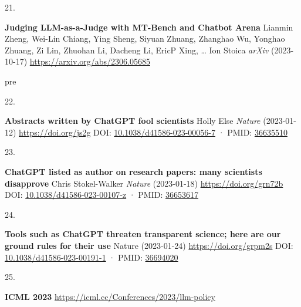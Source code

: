 \documentclass[
]{article}
\newlength{\cslhangindent}
\newlength{\csllabelwidth}
\newlength{\cslentryspacingunit} %
\newenvironment{CSLReferences}[2] %
 {%
  \setlength{\parindent}{0pt}
  \ifodd #1
  \let\oldpar\par
  \def\par{\hangindent=\cslhangindent\oldpar}
  \fi
  \setlength{\parskip}{#2\cslentryspacingunit}
 }%
 {}
\newcommand{\CSLBlock}[1]{#1\hfill\break}
\newcommand{\CSLLeftMargin}[1]{\parbox[t]{\csllabelwidth}{#1}}
\newcommand{\CSLRightInline}[1]{\parbox[t]{\linewidth - \csllabelwidth}{#1}\break}
\providecommand{\DIFaddtex}[1]{{\protect\color{blue}\uwave{#1}}} %
\providecommand{\DIFaddbegin}{} %
\providecommand{\DIFaddend}{} %
\providecommand{\DIFdelbegin}{} %
\providecommand{\DIFdelend}{} %
\providecommand{\DIFadd}[1]{\texorpdfstring{\DIFaddtex{#1}}{#1}} %
\newcommand{\DIFscaledelfig}{0.5}
\newlength{\DIFdelgraphicswidth} %
\newlength{\DIFdelgraphicsheight} %
\newcommand{\DIFaddincludegraphics}[2][]{{\color{blue}\fbox{\DIFOincludegraphics[#1]{#2}}}} %
\newcommand{\DIFdelincludegraphics}[2][]{%
\sbox{\DIFdelgraphicsbox}{\DIFOincludegraphics[#1]{#2}}%
\settoboxwidth{\DIFdelgraphicswidth}{\DIFdelgraphicsbox} %
\settoboxtotalheight{\DIFdelgraphicsheight}{\DIFdelgraphicsbox} %
\scalebox{\DIFscaledelfig}{%
\parbox[b]{\DIFdelgraphicswidth}{\usebox{\DIFdelgraphicsbox}\\[-\baselineskip] \rule{\DIFdelgraphicswidth}{0em}}\llap{\resizebox{\DIFdelgraphicswidth}{\DIFdelgraphicsheight}{%
\setlength{\unitlength}{\DIFdelgraphicswidth}%
\begin{picture}(1,1)%
\thicklines\linethickness{2pt} %
{\color[rgb]{1,0,0}\put(0,0){\framebox(1,1){}}}%
{\color[rgb]{1,0,0}\put(0,0){\line( 1,1){1}}}%
{\color[rgb]{1,0,0}\put(0,1){\line(1,-1){1}}}%
\end{picture}%
}\hspace*{3pt}}} %
} %
\DeclareRobustCommand{\DIFaddbegin}{\DIFOaddbegin \let\includegraphics\DIFaddincludegraphics} %
\DeclareRobustCommand{\DIFaddend}{\DIFOaddend \let\includegraphics\DIFOincludegraphics} %
\DeclareRobustCommand{\DIFdelbegin}{\DIFOdelbegin \let\includegraphics\DIFdelincludegraphics} %
\DeclareRobustCommand{\DIFdelend}{\DIFOaddend \let\includegraphics\DIFOincludegraphics} %
\begin{document}
\begin{CSLReferences}{0}{0}
\leavevmode\vadjust pre{\DIFaddbegin \hypertarget{ref-LhEwBH2w}{}}%
\CSLLeftMargin{21. }%
\CSLRightInline{\textbf{Judging LLM-as-a-Judge with MT-Bench and Chatbot Arena}
\CSLBlock{Lianmin Zheng, Wei-Lin Chiang, Ying Sheng, Siyuan Zhuang, Zhanghao Wu, Yonghao Zhuang, Zi Lin, Zhuohan Li, Dacheng Li, EricP Xing, \ldots{} Ion Stoica} \emph{arXiv} (2023-10-17) \url{https://arxiv.org/abs/2306.05685}}

\leavevmode\vadjust \DIFadd{pre}{\DIFaddend \hypertarget{ref-1EAonKBXJ}{}}%
\DIFdelbegin %
\DIFdelend \DIFaddbegin \CSLLeftMargin{22. }\DIFaddend %
\CSLRightInline{\textbf{Abstracts written by ChatGPT fool scientists}
\CSLBlock{Holly Else} \emph{Nature} (2023-01-12) \url{https://doi.org/js2g}
\CSLBlock{DOI: \href{https://doi.org/10.1038/d41586-023-00056-7}{10.1038/d41586-023-00056-7} · PMID: \href{https://www.ncbi.nlm.nih.gov/pubmed/36635510}{36635510}}}

\leavevmode{}%
\DIFdelbegin %
\DIFdelend \DIFaddbegin \CSLLeftMargin{23. }\DIFaddend %
\CSLRightInline{\textbf{ChatGPT listed as author on research papers: many scientists disapprove}
\CSLBlock{Chris Stokel-Walker} \emph{Nature} (2023-01-18) \url{https://doi.org/grn72b}
\CSLBlock{DOI: \href{https://doi.org/10.1038/d41586-023-00107-z}{10.1038/d41586-023-00107-z} · PMID: \href{https://www.ncbi.nlm.nih.gov/pubmed/36653617}{36653617}}}

\leavevmode{}%
\DIFdelbegin %
\DIFdelend \DIFaddbegin \CSLLeftMargin{24. }\DIFaddend %
\CSLRightInline{\textbf{Tools such as ChatGPT threaten transparent science; here are our ground rules for their use}
\CSLBlock{Nature} (2023-01-24) \url{https://doi.org/grpm2s}
\CSLBlock{DOI: \href{https://doi.org/10.1038/d41586-023-00191-1}{10.1038/d41586-023-00191-1} · PMID: \href{https://www.ncbi.nlm.nih.gov/pubmed/36694020}{36694020}}}

\leavevmode{}%
\DIFdelbegin %
\DIFdelend \DIFaddbegin \CSLLeftMargin{25. }\DIFaddend %
\CSLRightInline{\textbf{ICML 2023} \url{https://icml.cc/Conferences/2023/llm-policy}}

\end{CSLReferences}
\end{document}
